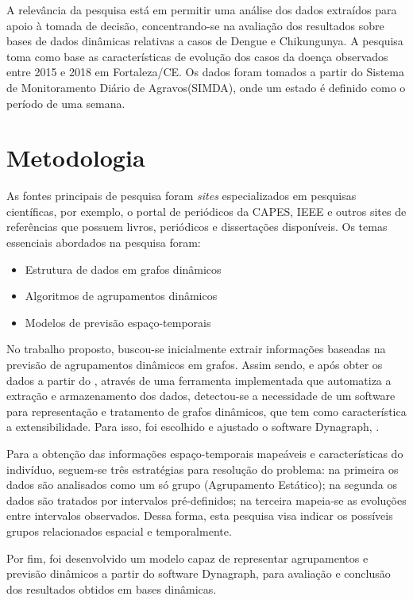 A relevância da pesquisa está em permitir uma análise dos dados extraídos 
para apoio à tomada de decisão,  concentrando-se na avaliação dos resultados sobre bases de dados
dinâmicas relativas a casos de Dengue e Chikungunya.
A pesquisa toma como base as características de evolução dos casos da doença
observados entre 2015 e 2018 em Fortaleza/CE.
Os dados foram tomados a partir do Sistema de Monitoramento Diário de Agravos(SIMDA), onde um estado é definido como o período de uma semana. 

\section{Metodologia}

As fontes principais de pesquisa foram \textit{sites} especializados em pesquisas científicas, por exemplo, o portal de periódicos
da CAPES, IEEE e outros sites de referências que possuem livros, periódicos e dissertações disponíveis.
Os temas essenciais abordados na pesquisa foram:
\begin{itemize}
	\item Estrutura de dados em grafos dinâmicos
	\item Algoritmos de agrupamentos dinâmicos
	\item Modelos de previsão espaço-temporais
\end{itemize}

No trabalho proposto, buscou-se inicialmente extrair informações baseadas na previsão de agrupamentos dinâmicos
em grafos. Assim sendo, e após obter os dados a partir do \cite{simda}, através de uma ferramenta implementada que automatiza a extração e armazenamento dos dados, detectou-se a necessidade de um software para representação e tratamento de grafos dinâmicos, que tem como característica a extensibilidade. Para isso, foi escolhido e ajustado o software Dynagraph, \cite{dynagraph}.

Para a obtenção das informações espaço-temporais mapeáveis e características do indivíduo, seguem-se três estratégias para resolução do problema: na primeira os dados são analisados como um só grupo (Agrupamento Estático); na segunda os dados são tratados por intervalos pré-definidos; na terceira mapeia-se as evoluções entre intervalos observados.
Dessa forma, esta pesquisa visa indicar os possíveis grupos relacionados espacial e temporalmente.

Por fim, foi desenvolvido um modelo capaz de representar agrupamentos e previsão dinâmicos a partir do software Dynagraph, para avaliação e conclusão dos resultados obtidos em bases dinâmicas.


